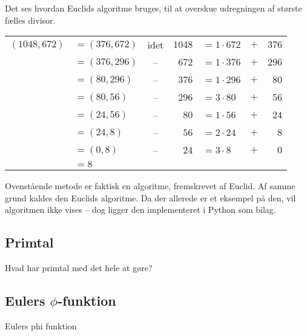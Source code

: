     Det ses hvordan Euclids algoritme bruges, til at overskue udregningen af største fælles divisor.

    \begin{eks}
        \begin{tabular*}{\textwidth}{r l c r l c r}
            \((1048, 672)\) & \(= (376, 672)\) & idet & \(1048\) & \(= 1 \cdot 672\) & \(+\) & \(376\)\\
            & \(= (376, 296)\) & -- & \(672\) & \(= 1 \cdot 376\) & \(+\) & \(296\)\\
            & \(= (80, 296)\) & -- & \(376\) & \(= 1 \cdot 296\) & \(+\) & \(80\)\\
            & \(= (80, 56)\) & -- & \(296\) & \(= 3 \cdot 80\) & \(+\) & \(56\)\\
            & \(= (24, 56)\) & -- & \(80\) & \(= 1 \cdot 56\) & \(+\) & \(24\)\\
            & \(= (24, 8)\) & -- & \(56\) & \(= 2 \cdot 24\) & \(+\) & \(8\)\\
            & \(= (0, 8)\) & -- & \(24\) & \(= 3 \cdot 8\) & \(+\) & \(0\)\\
            & \(= 8\) & & & & &
        \end{tabular*}
    \end{eks}

    Ovenstående metode er faktisk en algoritme, fremskrevet af Euclid. Af samme grund kaldes den Euclids algoritme.
    Da der allerede er et eksempel på den, vil algoritmen ikke vises -- dog ligger den implementeret i Python som bilag. %





    \subsection{Primtal}
    Hvad har primtal med det hele at gøre?

    \subsection{Eulers \texorpdfstring{\(\phi\)}{Lg}-funktion}
    Eulers phi funktion
